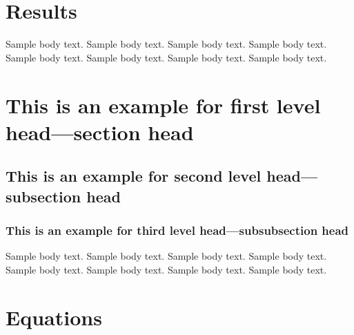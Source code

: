 \documentclass[lineno,pdflatex,sn-nature]{sn-jnl}%
\theoremstyle{thmstyleone}%
\theoremstyle{thmstyletwo}%
\theoremstyle{thmstylethree}%
\begin{document}




\section{Results}\label{sec2}

Sample body text. Sample body text. Sample body text. Sample body text. Sample body text. Sample body text. Sample body text. Sample body text.

\section{This is an example for first level head---section head}\label{sec3}

\subsection{This is an example for second level head---subsection head}\label{subsec2}

\subsubsection{This is an example for third level head---subsubsection head}\label{subsubsec2}

Sample body text. Sample body text. Sample body text. Sample body text. Sample body text. Sample body text. Sample body text. Sample body text. 

\section{Equations}\label{sec4}
\end{document}
